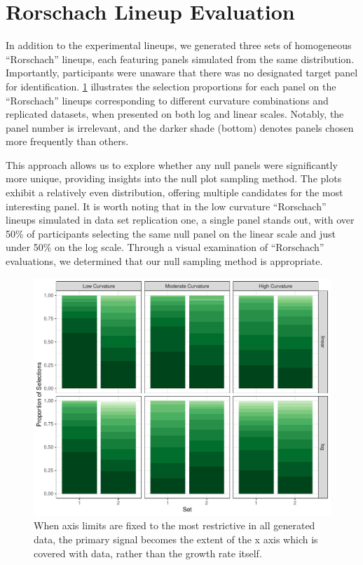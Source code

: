 \documentclass[12pt]{article}
\begin{document}
\renewcommand{\thesection}{B}

\hypertarget{rorschach-lineup-evaluation}{%
\section{Rorschach Lineup
Evaluation}\label{rorschach-lineup-evaluation}}

In addition to the experimental lineups, we generated three sets of
homogeneous ``Rorschach'' lineups, each featuring panels simulated from
the same distribution. Importantly, participants were unaware that there
was no designated target panel for identification.
\cref{fig:rorschach-lineups} illustrates the selection proportions for
each panel on the ``Rorschach'' lineups corresponding to different
curvature combinations and replicated datasets, when presented on both
log and linear scales. Notably, the panel number is irrelevant, and the
darker shade (bottom) denotes panels chosen more frequently than others.

This approach allows us to explore whether any null panels were
significantly more unique, providing insights into the null plot
sampling method. The plots exhibit a relatively even distribution,
offering multiple candidates for the most interesting panel. It is worth
noting that in the low curvature ``Rorschach'' lineups simulated in data
set replication one, a single panel stands out, with over 50\% of
participants selecting the same null panel on the linear scale and just
under 50\% on the log scale. Through a visual examination of
``Rorschach'' evaluations, we determined that our null sampling method
is appropriate.

\begin{figure}[tbp]

{\centering \includegraphics[width=.6\linewidth,]{appendix_files/figure-latex/rorschach-lineups-1} 

}

\caption{When axis limits are fixed to the most restrictive in all generated data, the primary signal becomes the extent of the x axis which is covered with data, rather than the growth rate itself.}\label{fig:rorschach-lineups}
\end{figure}
\end{document}
